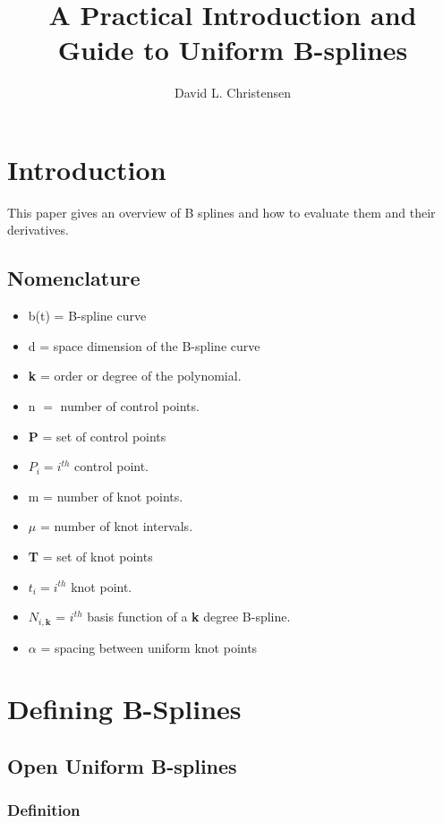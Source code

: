 \documentclass{article}
\title{A Practical Introduction and Guide to Uniform B-splines}
\author{David L. Christensen}
\begin{document}
\maketitle

\section{Introduction}
This paper gives an overview of B splines and how to evaluate them and their derivatives.

\subsection{Nomenclature}


\begin{itemize}
  \item[] b(t) = B-spline curve
  \item[] d = space dimension of the B-spline curve
  \item[] \textbf{k} = order or degree of the polynomial.
  \item[] n \(=\) number of control points.
  \item[] \textbf{P} = set of control points
  \item[] \(P_i = i^{th}\) control point.
  \item[] m = number of knot points.
  \item[] \(\mu\) = number of knot intervals.
  \item[] \textbf{T} = set of knot points 
  \item[] \(t_i = i^{th}\) knot point.
  \item[] \(N_{i , \textbf{k}}\) = \(i^{th}\) basis function of a \textbf{k} degree B-spline.
  \item[] \(\alpha\) = spacing between uniform knot points
\end{itemize}

\section{Defining B-Splines}

\subsection{Open Uniform B-splines}

\subsubsection{Definition}
\end{document}
